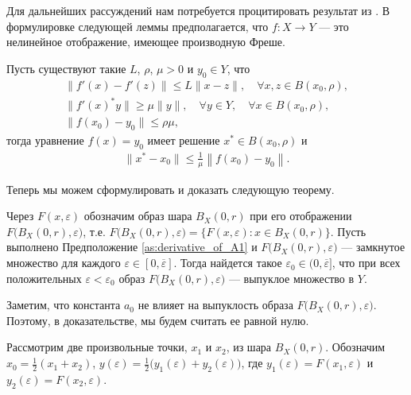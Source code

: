 \documentclass[../main.tex]{subfiles}
\begin{document}
Для дальнейших рассуждений нам потребуется процитировать результат из \cite{Polyak2001, Polyak1964}. 
В формулировке следующей леммы предполагается, что $f:X \to Y$ --- это нелинейное отображение, имеющее производную Фреше.
\begin{lemma}\label{lem:Polyak_lemma}
    Пусть существуют такие $L$, $\rho$, $\mu > 0$ и $y_0 \in Y$, что 
    \begin{gather*}
        \| f'(x) - f'(z) \| \leqslant L \| x - z\|, \quad \forall x,z \in B(x_0,\rho), \\
        \| f'(x)^*y \| \geqslant \mu \|y \|, \quad \forall y \in Y, \quad \forall x \in B(x_0, \rho), \\
        \| f(x_0) - y_0 \| \leqslant \rho \mu,
    \end{gather*}
    тогда уравнение $f(x) = y_0$ имеет решение $x^* \in B(x_0,\rho)$ и 
    \begin{gather*}
        \|x^* - x_0\| \leqslant \frac{1}{\mu} \left\| f(x_0) - y_0 \right\|.
    \end{gather*}
\end{lemma}
Теперь мы можем сформулировать и доказать следующую теорему.
\begin{theorem}\label{th:ImageConvexity}
    Через $F(x,\varepsilon)$ обозначим образ шара $B_X(0, r)$ при его отображении $F\big(B_X(0,r),\varepsilon\big)$, т.е. $F\big(B_X(0,r),\varepsilon\big) = \big\{F(x,\varepsilon): x\in B_X(0, r)\big\}$.
    Пусть выполнено Предположение \ref{as:derivative_of_A1} и $F\big(B_X(0,r),\varepsilon\big)$ --- замкнутое множество для каждого  $\varepsilon \in [0, \overline{\varepsilon}]$. 
Тогда найдется такое $ \varepsilon_0 \in (0, \overline{\varepsilon}]$, что при всех положительных $\varepsilon < \varepsilon_0$ образ $F\big(B_X(0,r),\varepsilon\big)$ --- выпуклое множество в $Y$. 
\end{theorem}
\doc
Заметим, что константа $a_0$ не влияет на выпуклость образа $F\big(B_X(0,r),\varepsilon\big)$. 
Поэтому, в доказательстве, мы будем считать ее равной нулю.

Рассмотрим две произвольные точки, $x_1$ и $x_2$, из шара $B_X(0,r)$. 
Обозначим $x_0 = \frac{1}{2}(x_1 + x_2)$, $y(\varepsilon) = \frac{1}{2}\big(y_1(\varepsilon)  + y_2(\varepsilon)\big)$, где $y_1(\varepsilon) = F(x_1, \varepsilon)$ и $y_2(\varepsilon) = F(x_2, \varepsilon)$. 
\end{document}
